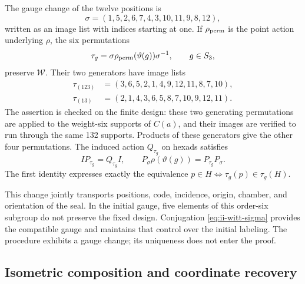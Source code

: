 The gauge change of the twelve positions is
\begin{equation}
 \sigma=(1,5,2,6,7,4,3,10,11,9,8,12),
 \label{eq:ii-witt-sigma}
\end{equation}
written as an image list with indices starting at one. If
\(\rho_{\rm perm}\) is the point action underlying \(\rho\), the
six permutations
\[
 \tau_g=\sigma\rho_{\rm perm}(\vartheta(g))\sigma^{-1},\qquad g\in S_3,
\]
preserve \(\mathcal W\). Their two generators have image lists
\[
\begin{aligned}
 \tau_{(123)}&=(3,6,5,2,1,4,9,12,11,8,7,10),\\
 \tau_{(13)}&=(2,1,4,3,6,5,8,7,10,9,12,11).
\end{aligned}
\]
The assertion is checked on the finite design: these two generating
permutations are applied to the weight-six supports of
\(C(a)\), and their images are verified to run through the
same 132 supports. Products of these generators give the other
four permutations. The induced action \(Q_{\tau_g}\) on hexads
satisfies
\begin{equation}
 I P_{\tau_g}=Q_{\tau_g}I,
 \qquad
 P_\sigma\rho(\vartheta(g))=P_{\tau_g}P_\sigma.
 \label{eq:ii-witt-recalibration}
\end{equation}
The first identity expresses exactly the equivalence
\(p\in H\Longleftrightarrow\tau_g(p)\in\tau_g(H)\).

This change jointly transports positions, code, incidence,
origin, chamber, and orientation of the seal. In the initial gauge, five
elements of this order-six subgroup do not preserve the fixed design.
Conjugation \eqref{eq:ii-witt-sigma} provides the compatible gauge
and maintains that control over the initial labeling. The procedure
exhibits a gauge change; its uniqueness does not enter the proof.

\subsection{Isometric composition and coordinate recovery}

